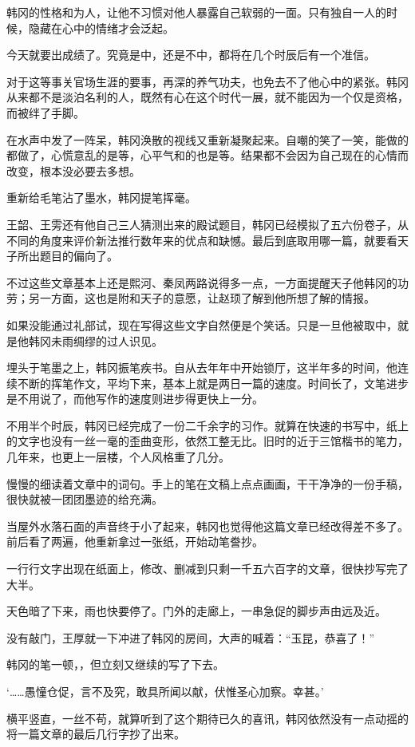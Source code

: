 韩冈的性格和为人，让他不习惯对他人暴露自己软弱的一面。只有独自一人的时候，隐藏在心中的情绪才会泛起。

今天就要出成绩了。究竟是中，还是不中，都将在几个时辰后有一个准信。

对于这等事关官场生涯的要事，再深的养气功夫，也免去不了他心中的紧张。韩冈从来都不是淡泊名利的人，既然有心在这个时代一展，就不能因为一个仅是资格，而被绊了手脚。

在水声中发了一阵呆，韩冈涣散的视线又重新凝聚起来。自嘲的笑了一笑，能做的都做了，心慌意乱的是等，心平气和的也是等。结果都不会因为自己现在的心情而改变，根本没必要去多想。

重新给毛笔沾了墨水，韩冈提笔挥毫。

王韶、王雱还有他自己三人猜测出来的殿试题目，韩冈已经模拟了五六份卷子，从不同的角度来评价新法推行数年来的优点和缺憾。最后到底取用哪一篇，就要看天子所出题目的偏向了。

不过这些文章基本上还是熙河、秦凤两路说得多一点，一方面提醒天子他韩冈的功劳；另一方面，这也是附和天子的意愿，让赵顼了解到他所想了解的情报。

如果没能通过礼部试，现在写得这些文字自然便是个笑话。只是一旦他被取中，就是他韩冈未雨绸缪的过人识见。

埋头于笔墨之上，韩冈振笔疾书。自从去年年中开始锁厅，这半年多的时间，他连续不断的挥笔作文，平均下来，基本上就是两日一篇的速度。时间长了，文笔进步是不用说了，而他写作的速度则进步得更快上一分。

不用半个时辰，韩冈已经完成了一份二千余字的习作。就算在快速的书写中，纸上的文字也没有一丝一毫的歪曲变形，依然工整无比。旧时的近于三馆楷书的笔力，几年来，也更上一层楼，个人风格重了几分。

慢慢的细读着文章中的词句。手上的笔在文稿上点点画画，干干净净的一份手稿，很快就被一团团墨迹的给充满。

当屋外水落石面的声音终于小了起来，韩冈也觉得他这篇文章已经改得差不多了。前后看了两遍，他重新拿过一张纸，开始动笔誊抄。

一行行文字出现在纸面上，修改、删减到只剩一千五六百字的文章，很快抄写完了大半。

天色暗了下来，雨也快要停了。门外的走廊上，一串急促的脚步声由远及近。

没有敲门，王厚就一下冲进了韩冈的房间，大声的喊着：“玉昆，恭喜了！”

韩冈的笔一顿，，但立刻又继续的写了下去。

‘……愚憧仓促，言不及究，敢具所闻以献，伏惟圣心加察。幸甚。’

横平竖直，一丝不苟，就算听到了这个期待已久的喜讯，韩冈依然没有一点动摇的将一篇文章的最后几行字抄了出来。

